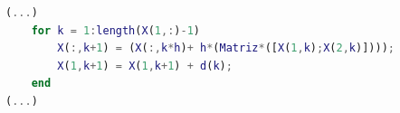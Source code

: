 \begin{lstlisting}[frame=none,language=Matlab,label={code:exemplo},backgroundcolor=\color{gray!15},numbers=none,		basicstyle=\tiny\ttfamily]
(...)
    for k = 1:length(X(1,:)-1)
        X(:,k+1) = (X(:,k*h)+ h*(Matriz*([X(1,k);X(2,k)])));
        X(1,k+1) = X(1,k+1) + d(k);
    end
(...)
\end{lstlisting}
